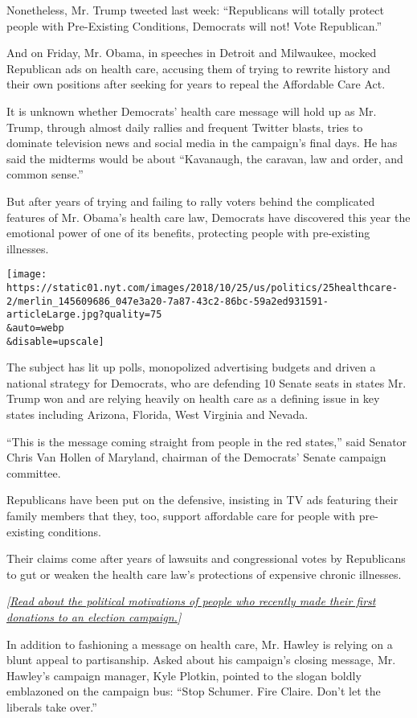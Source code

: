 Nonetheless, Mr. Trump tweeted last week: ``Republicans will totally
protect people with Pre-Existing Conditions, Democrats will not! Vote
Republican.''

And on Friday, Mr. Obama, in speeches in Detroit and Milwaukee, mocked
Republican ads on health care, accusing them of trying to rewrite
history and their own positions after seeking for years to repeal the
Affordable Care Act.

It is unknown whether Democrats' health care message will hold up as Mr.
Trump, through almost daily rallies and frequent Twitter blasts, tries
to dominate television news and social media in the campaign's final
days. He has said the midterms would be about ``Kavanaugh, the caravan,
law and order, and common sense.''

But after years of trying and failing to rally voters behind the
complicated features of Mr. Obama's health care law, Democrats have
discovered this year the emotional power of one of its benefits,
protecting people with pre-existing illnesses.

\texttt{[image: https://static01.nyt.com/images/2018/10/25/us/politics/25healthcare-2/merlin\_145609686\_047e3a20-7a87-43c2-86bc-59a2ed931591-articleLarge.jpg?quality=75\\\&auto=webp\\\&disable=upscale]}

The subject has lit up polls, monopolized advertising budgets and driven
a national strategy for Democrats, who are defending 10 Senate seats in
states Mr. Trump won and are relying heavily on health care as a
defining issue in key states including Arizona, Florida, West Virginia
and Nevada.

``This is the message coming straight from people in the red states,''
said Senator Chris Van Hollen of Maryland, chairman of the Democrats'
Senate campaign committee.

Republicans have been put on the defensive, insisting in TV ads
featuring their family members that they, too, support affordable care
for people with pre-existing conditions.

Their claims come after years of lawsuits and congressional votes by
Republicans to gut or weaken the health care law's protections of
expensive chronic illnesses.

\emph{{[}}\href{https://www.nytimes.com/2018/10/27/reader-center/first-time-donors.html}{\emph{Read
about the political motivations of people who recently made their first
donations to an election campaign.}}\emph{{]}}

In addition to fashioning a message on health care, Mr. Hawley is
relying on a blunt appeal to partisanship. Asked about his campaign's
closing message, Mr. Hawley's campaign manager, Kyle Plotkin, pointed to
the slogan boldly emblazoned on the campaign bus: ``Stop Schumer. Fire
Claire. Don't let the liberals take over.''


